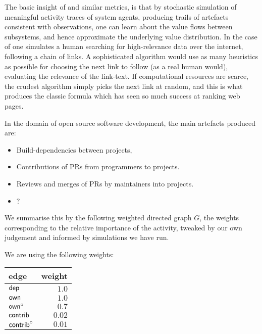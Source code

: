 The basic insight of \pagerank{} and similar metrics, is that by
stochastic simulation of meaningful activity traces of system agents,
producing trails of artefacts consistent with observations, one can
learn about the value flows between subsystems, and hence approximate
the underlying value distribution. In the case of \pagerank{} one
simulates a human searching for high-relevance data over the internet,
following a chain of links. A sophisticated algorithm would use as
many heuristics as possible for choosing the next link to follow (as a
real human would), \eg{} evaluating the relevance of the link-text. If
computational resources are scarce, the crudest algorithm simply picks
the next link at random, and this is what produces the classic
\pagerank{} formula which has seen so much success at ranking web
pages.

In the domain of open source software development, the main artefacts
produced are:
\begin{itemize}
  \item Build-dependencies between projects,
  \item Contributions of PRs from programmers to projects.
  \item Reviews and merges of PRs by maintainers into projects.
  \item ? %
\end{itemize}

We summarise this by the following weighted directed graph $G$, the
weights corresponding to the relative importance of the activity,
tweaked by our own judgement and informed by simulations we have run.


We are using the following weights:
\begin{center}
  \begin{tabular}{lr}
  edge & weight \\
  \hline
  $\mathsf{dep}$ & $1.0$ \\
  $\mathsf{own}$ & $1.0$ \\
  $\mathsf{own}^\circ$ & $0.7$\\
  $\mathsf{contrib}$ & $0.02$ \\
  $\mathsf{contrib}^\circ$ & $0.01$
  \end{tabular}
\end{center}

